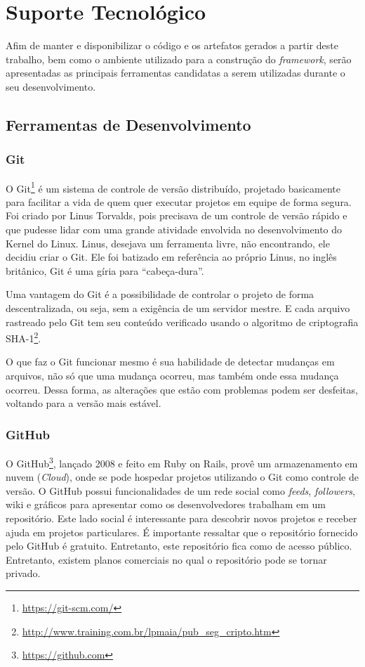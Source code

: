 \chapter{Suporte Tecnológico}
\label{chapter:Suporte_Tecnologico}

Afim de manter e disponibilizar o código e os artefatos gerados a partir deste trabalho, bem como o ambiente utilizado para a construção do \textit{framework}, serão apresentadas as principais ferramentas candidatas a serem utilizadas durante o seu desenvolvimento.

\section{Ferramentas de Desenvolvimento}

\subsection{Git}

O Git\footnote{\url{https://git-scm.com/}} é um sistema de controle de versão distribuído, projetado basicamente para facilitar a vida de quem quer executar projetos em equipe de forma segura. Foi criado por Linus Torvalds, pois precisava de um controle de versão rápido e que pudesse lidar com uma grande atividade envolvida no desenvolvimento do Kernel do Linux. Linus, desejava um ferramenta livre, não encontrando, ele decidiu criar o Git. Ele foi batizado em referência ao próprio Linus, no inglês britânico, Git é uma gíria para ``cabeça-dura''.

Uma vantagem do Git é a possibilidade de controlar o projeto de forma descentralizada, ou seja, sem a exigência de um servidor mestre. E cada arquivo rastreado pelo Git tem seu conteúdo verificado usando o algoritmo de criptografia SHA-1\footnote{\url{http://www.training.com.br/lpmaia/pub_seg_cripto.htm}}.

O que faz o Git funcionar mesmo é sua habilidade de detectar mudanças em arquivos, não só que uma mudança ocorreu, mas também onde essa mudança ocorreu. Dessa forma, as alterações que estão com problemas podem ser desfeitas, voltando para a versão mais estável.

\subsection{GitHub}

O GitHub\footnote{\url{https://github.com}}, lançado 2008 e feito em Ruby on Rails, provê um armazenamento em nuvem (\textit{Cloud}), onde se pode hospedar projetos utilizando o Git como controle de versão. O GitHub possui funcionalidades de um rede social como \textit{feeds}, \textit{followers}, wiki e gráficos para apresentar como os desenvolvedores trabalham em um repositório. Este lado social é interessante para descobrir novos projetos e receber ajuda em projetos particulares. É importante ressaltar que o repositório fornecido pelo GitHub é gratuito. Entretanto, este repositório fica como de acesso público. Entretanto, existem planos comerciais no qual o repositório pode se tornar privado.

